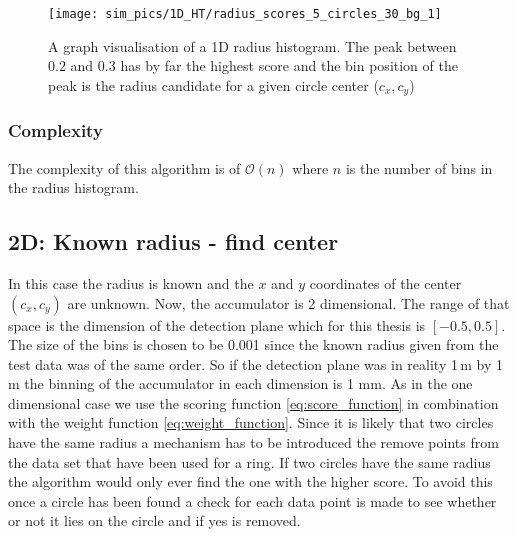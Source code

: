 \documentclass[11pt]{scrreprt}
\begin{document}
\begin{figure}[tb]
  \centering
  \texttt{[image: sim\_pics/1D\_HT/radius\_scores\_5\_circles\_30\_bg\_1]}
  \caption[Graph visualisation of a 1D radius histogram]{A graph visualisation of a 1D radius histogram. The peak between $0.2$ 
  and $0.3$ has by far the highest score and the bin
  position of the peak is the radius candidate for a given circle center ($c_x, c_y$)}
  \label{fig:1d_ht_radius_score}
\end{figure}

\subsubsection{Complexity} %
The complexity of this algorithm is of $\mathcal{O}(n)$ where $n$ is the number of bins in the radius histogram.
\label{ssub:complexity_1d}


\subsection{2D: Known radius - find center} %
\label{sub:2d_known_radius_find_center}
In this case the radius is known and the $x$ and $y$ coordinates of the center $(c_x, c_y)$ are unknown. Now, the accumulator is 2 
dimensional. The range of that space is the dimension of the detection plane which for this thesis is $[-0.5,0.5]$. The size of the 
bins is chosen to be 0.001 since the known radius given from the test data was of the same order. So if the detection plane was in 
reality 1\,m by 1\,m the binning of the accumulator in each dimension is 1 mm. As in the one dimensional case we use the scoring function 
\ref{eq:score_function} in combination with the weight function \ref{eq:weight_function}.
Since it is likely that two circles have the same radius a mechanism has to be introduced the remove points from the data set that
have been used for a ring. If two circles have the same radius the algorithm would only ever find the one with the higher score. To avoid
this once a circle has been found a check for each data point is made to see whether or not it lies on the circle and if yes is removed.
\end{document}
